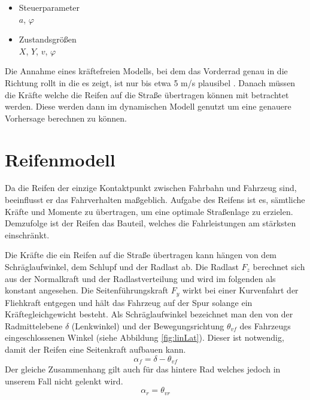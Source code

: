 \documentclass{like}
\begin{document}
\begin{itemize}
	\item Steuerparameter  \\
			\(a\), \(\varphi\)
	\item Zustandsgrößen \\
			\(X\), \(Y\), \(v\), \(\varphi\)
	
\end{itemize}


Die Annahme eines kräftefreien Modells, bei dem das Vorderrad genau in die Richtung rollt in die es zeigt, ist nur bis etwa 5 m/s plausibel \cite{rajamani2011vehicle}. Danach müssen die Kräfte welche die Reifen auf die Straße übertragen können mit betrachtet werden. Diese werden dann im dynamischen Modell genutzt um eine genauere Vorhersage berechnen zu können.



\section{Reifenmodell}
\label{tireModel}
Da die Reifen der einzige Kontaktpunkt zwischen Fahrbahn und Fahrzeug sind,  beeinflusst er das Fahrverhalten maßgeblich. Aufgabe des Reifens ist es, sämtliche Kräfte und Momente zu übertragen, um eine optimale Straßenlage zu erzielen. Demzufolge ist der Reifen das Bauteil, welches die Fahrleistungen am stärksten einschränkt.

Die Kräfte die ein Reifen auf die Straße übertragen kann hängen von dem Schräglaufwinkel, dem Schlupf und der Radlast ab. Die Radlast \(F_z\) berechnet sich aus der Normalkraft und der Radlastverteilung und wird im folgenden als konstant angesehen.
Die Seitenführungskraft \(F_y\) wirkt bei einer Kurvenfahrt der Fliehkraft entgegen und hält das Fahrzeug auf der Spur solange ein Kräftegleichgewicht besteht. Als Schräglaufwinkel bezeichnet man den von der Radmittelebene \(\delta\) (Lenkwinkel) und der Bewegungsrichtung \(\theta_{vf}\) des Fahrzeugs eingeschlossenen Winkel (siehe Abbildung \ref{fig:linLat}). Dieser ist notwendig, damit der Reifen eine Seitenkraft aufbauen kann. \\

\begin{equation}
\alpha_f = \delta - \theta_{vf}
\end{equation}
Der gleiche Zusammenhang gilt auch für das hintere Rad welches jedoch in unserem Fall nicht gelenkt wird.
\begin{equation}
\alpha_r = \theta_{vr}
\end{equation}
\end{document}
